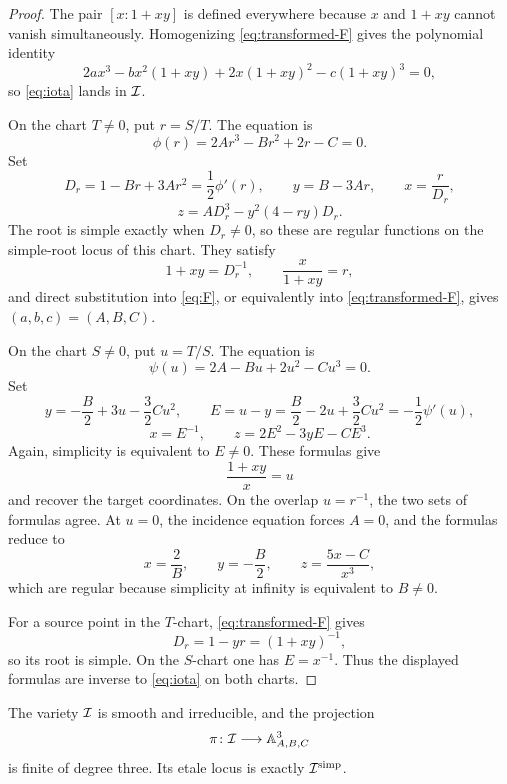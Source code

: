 \begin{proof}
The pair $[x:1+xy]$ is defined everywhere because $x$ and $1+xy$ cannot vanish simultaneously.  Homogenizing \eqref{eq:transformed-F} gives the polynomial identity
\begin{equation}\label{eq:binary-identity}
  2ax^3-bx^2(1+xy)+2x(1+xy)^2-c(1+xy)^3=0,
\end{equation}
so \eqref{eq:iota} lands in $\mathcal I$.

On the chart $T\neq0$, put $r=S/T$.  The equation is
\[
  \phi(r)=2Ar^3-Br^2+2r-C=0.
\]
Set
\begin{equation}\label{eq:T-chart-inverse}
  D_r=1-Br+3Ar^2=\frac12\phi'(r),
  \qquad
  y=B-3Ar,
  \qquad
  x=\frac{r}{D_r},
\end{equation}
\begin{equation}\label{eq:T-chart-z}
  z=AD_r^3-y^2(4-ry)D_r.
\end{equation}
The root is simple exactly when $D_r\neq0$, so these are regular functions on the simple-root locus of this chart.  They satisfy
\[
  1+xy=D_r^{-1},
  \qquad
  \frac{x}{1+xy}=r,
\]
and direct substitution into \eqref{eq:F}, or equivalently into \eqref{eq:transformed-F}, gives $(a,b,c)=(A,B,C)$.

On the chart $S\neq0$, put $u=T/S$.  The equation is
\[
  \psi(u)=2A-Bu+2u^2-Cu^3=0.
\]
Set
\begin{equation}\label{eq:S-chart-inverse}
  y=-\frac B2+3u-\frac32Cu^2,
  \qquad
  E=u-y=\frac B2-2u+\frac32Cu^2=-\frac12\psi'(u),
\end{equation}
\begin{equation}\label{eq:S-chart-xz}
  x=E^{-1},
  \qquad
  z=2E^2-3yE-CE^3.
\end{equation}
Again, simplicity is equivalent to $E\neq0$.  These formulas give
\[
  \frac{1+xy}{x}=u
\]
and recover the target coordinates.  On the overlap $u=r^{-1}$, the two sets of formulas agree.  At $u=0$, the incidence equation forces $A=0$, and the formulas reduce to
\[
  x=\frac2B,
  \qquad
  y=-\frac B2,
  \qquad
  z=\frac{5x-C}{x^3},
\]
which are regular because simplicity at infinity is equivalent to $B\neq0$.

For a source point in the $T$-chart, \eqref{eq:transformed-F} gives
\[
  D_r=1-yr=(1+xy)^{-1},
\]
so its root is simple.  On the $S$-chart one has $E=x^{-1}$.  Thus the displayed formulas are inverse to \eqref{eq:iota} on both charts.
\end{proof}

\begin{proposition}\label{prop:incidence-finite}
The variety $\mathcal I$ is smooth and irreducible, and the projection
\[
  \pi\colon\mathcal I\longrightarrow\mathbb A^3_{A,B,C}
\]
is finite of degree three.  Its etale locus is exactly $\mathcal I^{\mathrm{simp}}$.
\end{proposition}


